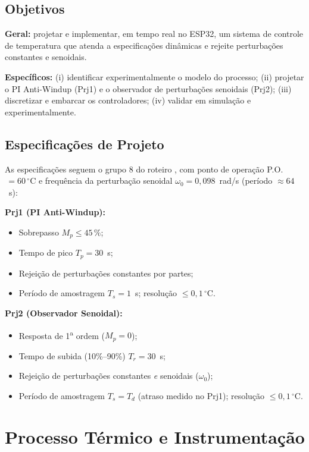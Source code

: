 \documentclass[a4paper]{ifacconf}
\begin{document}
\subsection{Objetivos}
\noindent \textbf{Geral:} projetar e implementar, em tempo real no ESP32, um sistema de controle de temperatura que atenda a especificações dinâmicas e rejeite perturbações constantes e senoidais.

\noindent \textbf{Específicos:} (i) identificar experimentalmente o modelo do processo; (ii) projetar o PI Anti-Windup (Prj1) e o observador de perturbações senoidais (Prj2); (iii) discretizar e embarcar os controladores; (iv) validar em simulação e experimentalmente.

\subsection{Especificações de Projeto}

As especificações seguem o grupo 8 do roteiro \citep{Bauchspiess:CDig}, com ponto de operação P.O.$\,=60\,^{\circ}$C e frequência da perturbação senoidal $\omega_0 = 0{,}098$~rad/s (período $\approx 64$~s):

\textbf{Prj1 (PI Anti-Windup):}
\begin{itemize}
    \item Sobrepasso $M_{p} \le 45\,\%$;
    \item Tempo de pico $T_{p} = 30$~s;
    \item Rejeição de perturbações constantes por partes;
    \item Período de amostragem $T_s = 1$~s; resolução $\le 0{,}1\,^{\circ}$C.
\end{itemize}

\textbf{Prj2 (Observador Senoidal):}
\begin{itemize}
    \item Resposta de 1\textsuperscript{a} ordem ($M_p = 0$);
    \item Tempo de subida (10\%--90\%) $T_r = 30$~s;
    \item Rejeição de perturbações constantes \emph{e} senoidais ($\omega_0$);
    \item Período de amostragem $T_s = T_d$ (atraso medido no Prj1); resolução $\le 0{,}1\,^{\circ}$C.
\end{itemize}

\section{Processo Térmico e Instrumentação}
\end{document}

